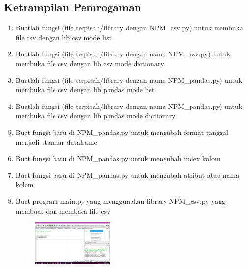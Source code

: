 \begin{enumerate}
\section{Ketrampilan Pemrogaman}
\begin{enumerate}
\item Buatlah fungsi (file terpisah/library dengan NPM\_csv.py) untuk membuka file csv dengan lib csv mode list.

\item Buatlah fungsi (file terpisah/library dengan nama NPM\_csv.py) untuk membuka file csv dengan lib csv mode dictionary

\item Buatlah fungsi (file terpisah/library dengan nama NPM\_pandas.py) untuk membuka file csv dengan lib pandas mode list

\item Buatlah fungsi (file terpisah/library dengan nama NPM\_pandas.py) untuk membuka file csv dengan lib pandas mode dictionary

\item Buat fungsi baru di NPM\_pandas.py untuk mengubah format tanggal menjadi standar dataframe

\item Buat fungsi baru di NPM\_pandas.py untuk mengubah index kolom

\item Buat fungsi baru di NPM\_pandas.py untuk mengubah atribut atau nama kolom

\item Buat program main.py yang menggunakan library NPM\_csv.py yang membuat dan membaca file csv

\begin{figure}[H]
			\includegraphics[width=4cm]{figures/1184065/kp1.png}
			\centering

\end{figure}
\end{enumerate}
\end{enumerate}
